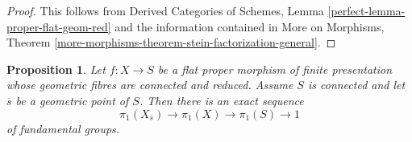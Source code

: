 \documentclass{stacks-project}
\theoremstyle{plain}
\newtheorem{proposition}[subsection]{Proposition}
\theoremstyle{definition}
\theoremstyle{remark}
\numberwithin{equation}{subsection}
\begin{document}
\begin{proof}
This follows from Derived Categories of Schemes,
Lemma \ref{perfect-lemma-proper-flat-geom-red}
and the information contained in
More on Morphisms, Theorem
\ref{more-morphisms-theorem-stein-factorization-general}.
\end{proof}

\begin{proposition}
\label{proposition-first-homotopy-sequence}
Let $f : X \to S$ be a flat proper morphism of finite presentation whose
geometric fibres are connected and reduced. Assume $S$ is connected and
let $\overline{s}$ be a geometric point of $S$. Then there is an exact
sequence
$$
\pi_1(X_{\overline{s}}) \to \pi_1(X) \to \pi_1(S) \to 1
$$
of fundamental groups.
\end{proposition}
\end{document}

